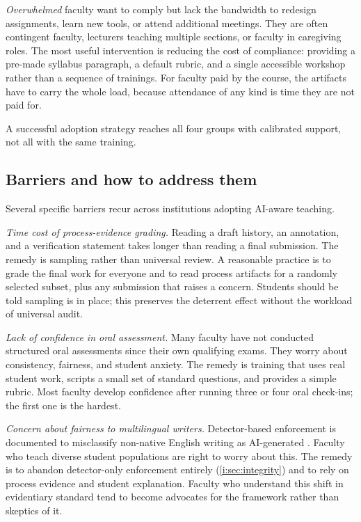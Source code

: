 \documentclass{SIAMbook2023}
\begin{document}
\textit{Overwhelmed} faculty want to comply but lack the bandwidth to redesign assignments, learn new tools, or attend additional meetings. They are often contingent faculty, lecturers teaching multiple sections, or faculty in caregiving roles. The most useful intervention is reducing the cost of compliance: providing a pre-made syllabus paragraph, a default rubric, and a single accessible workshop rather than a sequence of trainings. For faculty paid by the course, the artifacts have to carry the whole load, because attendance of any kind is time they are not paid for.

A successful adoption strategy reaches all four groups with calibrated support, not all with the same training.

\subsection{Barriers and how to address them}
\label{u:subsec:barriers}%

Several specific barriers recur across institutions adopting AI-aware teaching.

\textit{Time cost of process-evidence grading.} Reading a draft history, an annotation, and a verification statement takes longer than reading a final submission. The remedy is sampling rather than universal review. A reasonable practice is to grade the final work for everyone and to read process artifacts for a randomly selected subset, plus any submission that raises a concern. Students should be told sampling is in place; this preserves the deterrent effect without the workload of universal audit.

\textit{Lack of confidence in oral assessment.} Many faculty have not conducted structured oral assessments since their own qualifying exams. They worry about consistency, fairness, and student anxiety. The remedy is training that uses real student work, scripts a small set of standard questions, and provides a simple rubric. Most faculty develop confidence after running three or four oral check-ins; the first one is the hardest.

\textit{Concern about fairness to multilingual writers.} Detector-based enforcement is documented to misclassify non-native English writing as AI-generated \citep{liang2023gpt}. Faculty who teach diverse student populations are right to worry about this. The remedy is to abandon detector-only enforcement entirely (\cref{i:sec:integrity}) and to rely on process evidence and student explanation. Faculty who understand this shift in evidentiary standard tend to become advocates for the framework rather than skeptics of it.
\end{document}
